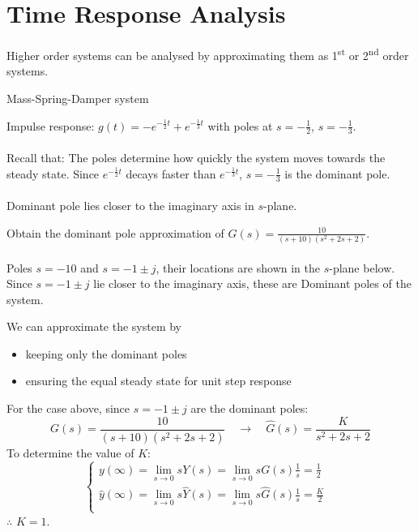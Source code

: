 \newpage
\section{Time Response Analysis}
Higher order systems can be analysed by approximating them as 1\textsuperscript{st} or 2\textsuperscript{nd} order systems. 
\begin{ex}{Mass-Spring-Damper system}
\begin{figure}[H] 
    \centering
    
\end{figure}
Impulse response: $g(t) = -e^{-\frac{1}{2}t}+ e^{-\frac{1}{3}t}$ with poles at $s=-\frac{1}{2}$, $s=-\frac{1}{3}$.\\\\
Recall that: The poles determine how quickly the system moves towards the steady state. Since $e^{-\frac{1}{2}t}$ decays faster than $e^{-\frac{1}{3}t}$, $s=-\frac{1}{3}$ is the dominant pole.\\\\
{\color{red}Dominant pole} lies closer to the imaginary axis in $s$-plane.
\begin{figure}[H] 
    \centering 
    
\end{figure}
\end{ex}
\begin{ex}{}
    Obtain the dominant pole approximation of $\displaystyle G(s) = \frac{10}{(s+10)(s^{2}+2s+2)}$.\\\\
    Poles $s=-10$ and $s = -1\pm j$, their locations are shown in the $s$-plane below. Since $s = -1 \pm j$ lie closer to the imaginary axis, these are {\color{red}Dominant poles} of the system.
    \begin{figure}[H] 
        \centering 
        
    \end{figure}
    We can approximate the system by 
    \begin{itemize}
    \item keeping only the dominant poles
    \item ensuring the equal steady state for unit step response
    \end{itemize}
    For the case above, since $s = -1\pm j$ are the dominant poles:
    \[ G(s) = \frac{10}{(s+10)(s^{2}+2s+2)} \quad \to \quad \hat{G}(s) =\frac{K}{s^{2}+2s+2}\]
    To determine the value of $K$:
    \[\begin{cases}
    \displaystyle
    y(\infty) = \lim_{s\to 0}sY(s) = \lim_{s\to0}sG(s)\frac{1}{s} = \frac{1}{2} \quad \\
    \displaystyle
    \hat{y}(\infty) = \lim_{s\to 0}s\hat{Y}(s) = \lim_{s\to0}s\hat{G}(s)\frac{1}{s} = \frac{K}{2}\\
    \end{cases}\]
    $\therefore$ \quad $K = 1$.
\end{ex}

